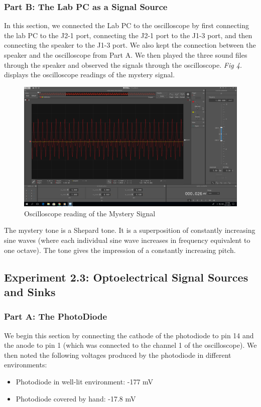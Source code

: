 \documentclass[10pt]{article}
\begin{document}
\subsubsection{Part B: The Lab PC as a Signal Source}
In this section, we connected the Lab PC to the oscilloscope by first connecting the lab PC to the J2-1 port, connecting the J2-1 port to the J1-3 port, and then connecting the speaker to the J1-3 port. We also kept the connection between the speaker and the oscilloscope from Part A. We then played the three sound files through the speaker and observed the signals through the oscilloscope. \textit{Fig 4.} displays the oscilloscope readings of the mystery signal. 
\begin{center}
	\begin{figure} [H]
		\centering
		\includegraphics[scale=0.22]{images/mystery.png}
		\caption{Oscilloscope reading of the Mystery Signal}
	\end{figure}
\end{center}

The mystery tone is a Shepard tone. It is a superposition of constantly increasing sine waves (where each individual sine wave increases in frequency equivalent to one octave). The tone gives the impression of a constantly increasing pitch. 


\subsection{Experiment 2.3: Optoelectrical Signal Sources and Sinks}
\subsubsection{Part A: The PhotoDiode}
We begin this section by connecting the cathode of the photodiode to pin 14 and the anode to pin 1 (which was connected to the channel 1 of the oscilloscope). We then noted the following voltages produced by the photodiode in different environments:
\begin{itemize}
	\item Photodiode in well-lit environment: -177 mV
	\item Photodiode covered by hand: -17.8 mV
\end{itemize}
\end{document}
